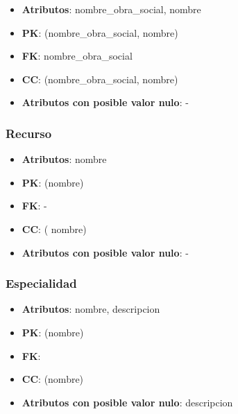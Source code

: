 \documentclass[a4paper,11pt]{article}
\begin{document}
\begin{itemize}

\item 
\textbf{Atributos}: nombre\_obra\_social, nombre

\item 
\textbf{PK}: (nombre\_obra\_social, nombre)

\item
\textbf{FK}: nombre\_obra\_social

\item 
\textbf{CC}: (nombre\_obra\_social, nombre)

\item 
\textbf{Atributos con posible valor nulo}: -

\end{itemize}
\subsubsection{\textbf{Recurso}}

\begin{itemize}

\item 
\textbf{Atributos}: nombre

\item 
\textbf{PK}: (nombre)

\item
\textbf{FK}: -

\item 
\textbf{CC}: ( nombre)

\item 
\textbf{Atributos con posible valor nulo}: -

\end{itemize}
\subsubsection{\textbf{Especialidad}}

\begin{itemize}

\item 
\textbf{Atributos}: nombre, descripcion

\item 
\textbf{PK}: (nombre)

\item
\textbf{FK}:

\item 
\textbf{CC}: (nombre)

\item 
\textbf{Atributos con posible valor nulo}: descripcion

\end{itemize}
\end{document}
